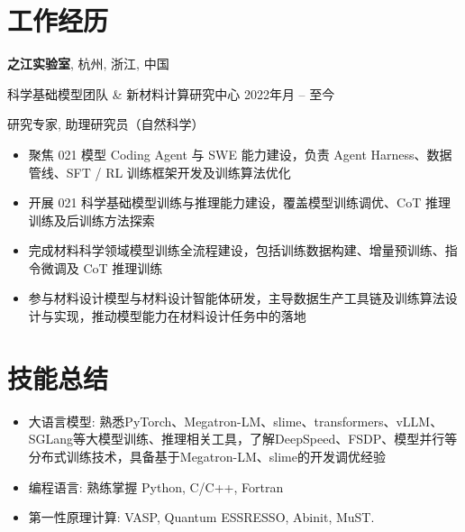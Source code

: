 \documentclass[
  a4paper,
  12pt
]{cv}
\renewcommand{\DatestampYMD}[3]{\mbox{#1年\number#2月}}
\begin{document}
\section{工作经历}

{\textbf{之江实验室}},
杭州, 浙江, 中国

科学基础模型团队 \& 新材料计算研究中心
\hfill
\DatestampYMD{2022}{07}{12} --
至今

研究专家, 助理研究员（自然科学）
\begin{itemize}
\item 聚焦 021 模型 Coding Agent 与 SWE 能力建设，负责 Agent Harness、数据管线、SFT / RL 训练框架开发及训练算法优化
\item 开展 021 科学基础模型训练与推理能力建设，覆盖模型训练调优、CoT 推理训练及后训练方法探索
\item 完成材料科学领域模型训练全流程建设，包括训练数据构建、增量预训练、指令微调及 CoT 推理训练
\item 参与材料设计模型与材料设计智能体研发，主导数据生产工具链及训练算法设计与实现，推动模型能力在材料设计任务中的落地
\end{itemize}

\section{技能总结}
\begin{itemize}
\item
大语言模型:  熟悉PyTorch、Megatron-LM、slime、transformers、vLLM、SGLang等大模型训练、推理相关工具，了解DeepSpeed、FSDP、模型并行等分布式训练技术，具备基于Megatron-LM、slime的开发调优经验
\item
编程语言:   
熟练掌握
Python, C/C++, Fortran
\item
第一性原理计算: 
VASP, Quantum ESSRESSO, Abinit, MuST.
\end{itemize}
\end{document}
